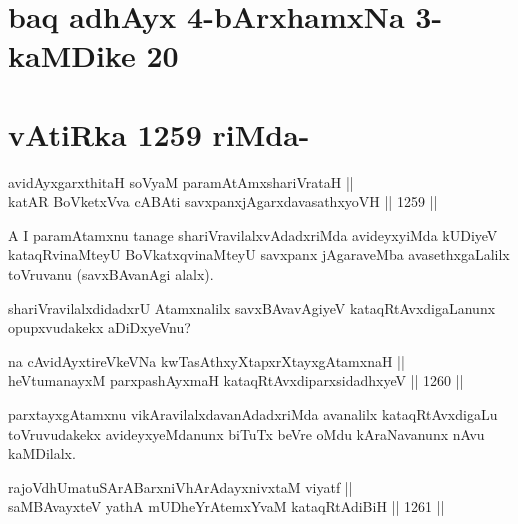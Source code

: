\section*{baq adhAyx 4-bArxhamxNa 3- kaMDike 20}

\section*{vAtiRka 1259 riMda-}


\begin{shl}
avidAyxgarxthitaH soV\s yaM paramAtAmx\s shariVrataH || \\
katAR BoVketxVva cA\s \s BAti savxpanxjAgarxdavasathxyoVH ||  1259 ||  
\end{shl}

\begin{artha}
A I paramAtamxnu tanage shariVravilalxvAdadxriMda avideyxyiMda kUDiyeV kataqRvinaMteyU BoVkatxqvinaMteyU savxpanx jAgaraveMba avasethxgaLalilx toVruvanu (savxBAvanAgi alalx).
\end{artha}

\begin{artha}
shariVravilalxdidadxrU Atamxnalilx savxBAvavAgiyeV kataqRtAvxdigaLanunx opupxvudakekx aDiDxyeVnu?
\end{artha}

\begin{shl}
na cAvidAyxtireVkeVNa kwTasAthxyXtapxrXtayxgAtamxnaH || \\
heVtumanayxM parxpashAyxmaH kataqRtAvxdiparxsidadhxyeV ||  1260 ||  
\end{shl}

\begin{artha}
parxtayxgAtamxnu vikAravilalxdavanAdadxriMda avanalilx kataqRtAvxdigaLu toVruvudakekx avideyxyeMdanunx biTuTx beVre oMdu kAraNavanunx nAvu kaMDilalx.
\end{artha}


\begin{shl}
rajoVdhUmatuSArABarx\footnotemark[1]niVhArAdayxnivxtaM viyatf || \\
saMBAvayxteV yathA mUDheYrAtemxYvaM kataqRtAdiBiH ||  1261 ||  
\end{shl}	

